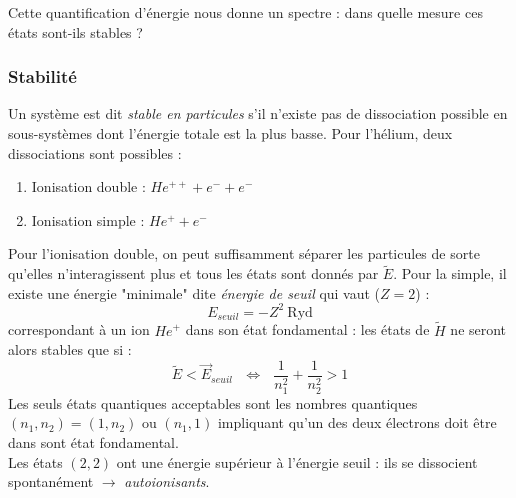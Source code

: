 \documentclass	[11pt, a4paper, openany]{book}
\newcommand{\E}{\vec E}
\begin{document}
	Cette quantification d'énergie nous donne un spectre : dans quelle mesure ces 
	états sont-ils stables ?
	
        \subsubsection{Stabilité}
	    Un système est dit \textit{stable en particules} s'il n'existe pas de dissociation 
	    possible en sous-systèmes dont l'énergie totale est la plus basse. Pour l'hélium, 
	    deux dissociations sont possibles : 
	    \begin{enumerate}
	    \item Ionisation double : $He^{++} + e^- + e^-$
	    \item Ionisation simple : $He^{+} + e^-$
	    \end{enumerate}

        Pour l'ionisation double, on peut suffisamment séparer les particules de sorte 
        qu'elles n'interagissent plus et tous les états sont donnés par $\tilde{E}$. Pour 
        la simple, il existe une énergie "minimale" dite \textit{énergie de seuil} qui 
        vaut ($Z=2$) :
        \begin{equation}
        E_{seuil} = -Z^2\ \text{Ryd}
        \end{equation}
	    correspondant à un ion $He^+$ dans son état fondamental : les états de $\tilde{H}$
	    ne seront alors stables que si : 
	    \begin{equation}
	    \tilde{E}<\E_{seuil}\ \ \ \Leftrightarrow\ \ \ \frac{1}{n_1^2}+\frac{1}{n_2^2} >1
	    \end{equation}
	    Les seuls états quantiques acceptables sont les nombres quantiques $(n_1,n_2) = (1,
	    n_2)$ ou $(n_1,1)$ impliquant qu'un des deux électrons doit être dans sont état
	    fondamental.\\
	    Les états $(2,2)$ ont une énergie supérieur à l'énergie seuil : ils se dissocient
	    spontanément $\rightarrow$ \textit{autoionisants}.
\end{document}
